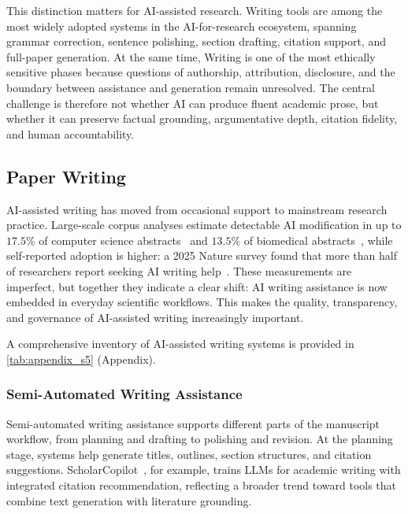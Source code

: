 \documentclass{llmxive}
\begin{document}
This distinction matters for AI-assisted research. Writing tools are among the most widely adopted systems in the AI-for-research ecosystem, spanning grammar correction, sentence polishing, section drafting, citation support, and full-paper generation. At the same time, Writing is one of the most ethically sensitive phases because questions of authorship, attribution, disclosure, and the boundary between assistance and generation remain unresolved. The central challenge is therefore not whether AI can produce fluent academic prose, but whether it can preserve factual grounding, argumentative depth, citation fidelity, and human accountability.



\subsection{Paper Writing}
\label{sec:writing}

AI-assisted writing has moved from occasional support to mainstream research practice. Large-scale corpus analyses estimate detectable AI modification in up to $17.5\%$ of computer science abstracts~\cite{liang2024mapping} and $13.5\%$ of biomedical abstracts~\cite{kobak2024delve}, while self-reported adoption is higher: a 2025 Nature survey found that more than half of researchers report seeking AI writing help~\cite{aireviewsurvey2025}. These measurements are imperfect, but together they indicate a clear shift: AI writing assistance is now embedded in everyday scientific workflows. This makes the quality, transparency, and governance of AI-assisted writing increasingly important.

A comprehensive inventory of AI-assisted writing systems is provided in \cref{tab:appendix_s5} (Appendix).



\subsubsection{Semi-Automated Writing Assistance}
\label{sec:writing_semi}

Semi-automated writing assistance supports different parts of the manuscript workflow, from planning and drafting to polishing and revision. At the planning stage, systems help generate titles, outlines, section structures, and citation suggestions. ScholarCopilot~\cite{scholarcop2025}, for example, trains LLMs for academic writing with integrated citation recommendation, reflecting a broader trend toward tools that combine text generation with literature grounding.
\end{document}
